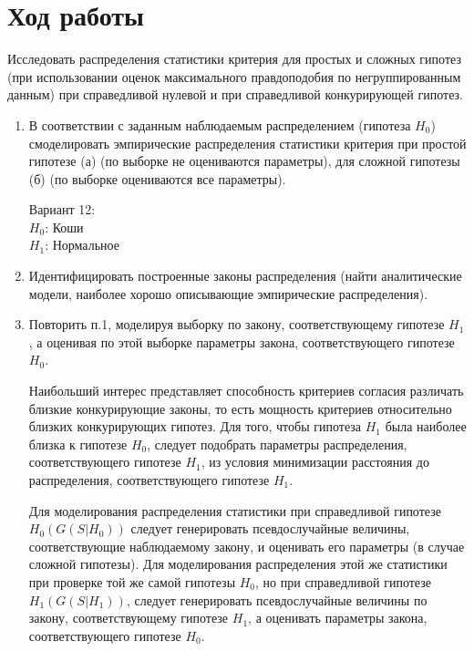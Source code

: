 \documentclass[a4paper,14pt]{extarticle}
\begin{document}
\section{Ход работы}

Исследовать распределения статистики критерия для простых и сложных
гипотез (при использовании оценок максимального правдоподобия по
негруппированным данным) при справедливой нулевой и при справедливой
конкурирующей гипотез.

\begin{enumerate}

	\item В соответствии с заданным наблюдаемым распределением (гипотеза $H_0$)
		смоделировать эмпирические распределения статистики критерия при простой
		гипотезе (а) (по выборке не оцениваются параметры), для сложной гипотезы
		(б) (по выборке оцениваются все параметры).

	Вариант 12: \\
	$H_0$: Коши \\
	$H_1$: Нормальное \\

	\item Идентифицировать построенные законы распределения (найти
		аналитические модели, наиболее хорошо описывающие эмпирические
		распределения).

	\item Повторить п.1, моделируя выборку по закону, соответствующему
		гипотезе $H_1$, а оценивая по этой выборке параметры закона,
		соответствующего гипотезе $H_0$.

	Наибольший интерес представляет способность критериев согласия
	различать близкие конкурирующие законы, то есть мощность критериев
	относительно близких конкурирующих гипотез. Для того, чтобы гипотеза $H_1$
	была наиболее близка к гипотезе $H_0$, следует подобрать параметры
	распределения, соответствующего гипотезе $H_1$, из условия минимизации
	расстояния до распределения, соответствующего гипотезе $H_1$.

	Для моделирования распределения статистики при справедливой гипотезе
	$H_0(G(S|H_0))$ следует генерировать псевдослучайные величины,
	соответствующие наблюдаемому закону, и оценивать его параметры (в случае
	сложной гипотезы). Для моделирования распределения этой же статистики при
	проверке той же самой гипотезы $H_0$, но при справедливой гипотезе
	$H_1(G(S|H_1))$, следует генерировать псевдослучайные величины по закону,
	соответствующему гипотезе $H_1$, а оценивать параметры закона,
	соответствующего гипотезе $H_0$.


\end{enumerate}
\end{document}
